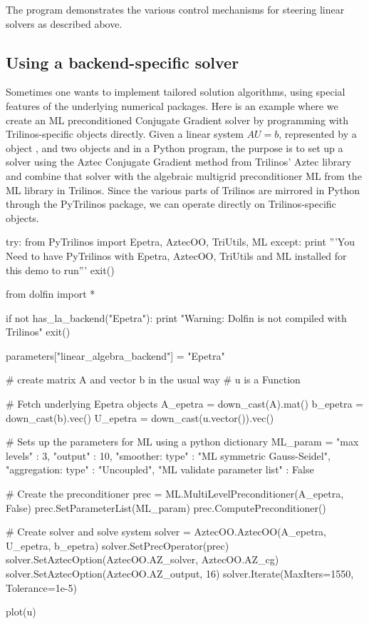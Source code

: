 The program  demonstrates the various control mechanisms for
steering linear solvers as described above.

\subsection{Using a backend-specific solver}
\label{langtangen:Epetra}


Sometimes one wants to implement tailored solution algorithms, using
special features of the underlying numerical packages.
Here is an example where we create an ML preconditioned Conjugate
Gradient solver by programming with Trilinos-specific objects directly.
Given a linear system
$AU=b$, represented by a  object ,
and two  objects  and  in a
Python program, the purpose is to
set up a solver using the Aztec Conjugate Gradient method from
Trilinos' Aztec library and combine that solver with the
algebraic multigrid preconditioner ML
from the ML library in Trilinos. Since the various parts of
Trilinos are mirrored in Python through the PyTrilinos package,
we can operate directly
on Trilinos-specific objects.
\begin{python}
try:
    from PyTrilinos import Epetra, AztecOO, TriUtils, ML
except:
    print '''You Need to have PyTrilinos with
Epetra, AztecOO, TriUtils and ML installed
for this demo to run'''
    exit()

from dolfin import *

if not has_la_backend("Epetra"):
    print "Warning: Dolfin is not compiled with Trilinos"
    exit()

parameters["linear_algebra_backend"] = "Epetra"

# create matrix A and vector b in the usual way
# u is a Function

# Fetch underlying Epetra objects
A_epetra = down_cast(A).mat()
b_epetra = down_cast(b).vec()
U_epetra = down_cast(u.vector()).vec()

# Sets up the parameters for ML using a python dictionary
ML_param = {"max levels"        : 3,
            "output"            : 10,
            "smoother: type"    : "ML symmetric Gauss-Seidel",
            "aggregation: type" : "Uncoupled",
            "ML validate parameter list" : False
}

# Create the preconditioner
prec = ML.MultiLevelPreconditioner(A_epetra, False)
prec.SetParameterList(ML_param)
prec.ComputePreconditioner()

# Create solver and solve system
solver = AztecOO.AztecOO(A_epetra, U_epetra, b_epetra)
solver.SetPrecOperator(prec)
solver.SetAztecOption(AztecOO.AZ_solver, AztecOO.AZ_cg)
solver.SetAztecOption(AztecOO.AZ_output, 16)
solver.Iterate(MaxIters=1550, Tolerance=1e-5)

plot(u)
\end{python}

